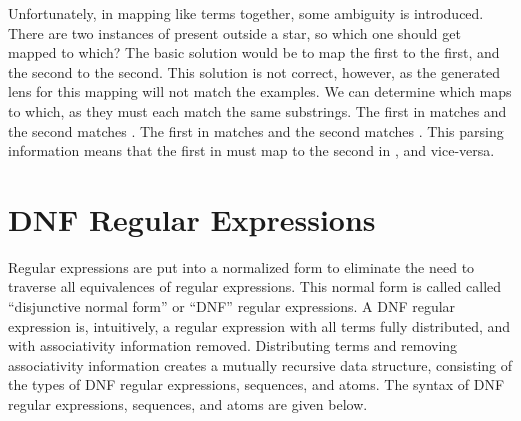\documentclass[numbers,10pt,preprint\ifanon ,nocopyrightspace\fi]{sigplanconf}
\begin{document}
Unfortunately, in mapping like terms together, some ambiguity is introduced.
There are two
instances of  present outside a star, so which one should get mapped to
which?  The basic solution would be to map the first to the first, and the
second to the second.  This solution is not correct, however, as the generated
lens for
this mapping will not match the examples.  We can determine which maps to which, as they
must each match the same substrings.  The first  in 
matches  and the second matches .  The first 
in  matches  and the second matches .
This parsing information means that the first  in  must map to the second
 in , and vice-versa.




\section{DNF Regular Expressions}

Regular expressions are put into a normalized form to eliminate the
need to traverse all equivalences of regular expressions.
This normal form is called called ``disjunctive normal form'' or
``DNF'' regular expressions.
A DNF regular expression is, intuitively, a regular expression with
all terms fully distributed, and with associativity information removed.
Distributing terms and removing associativity information creates a mutually
recursive data structure, consisting of the types of
DNF regular expressions, sequences, and atoms.
The syntax of DNF regular
expressions, sequences, and atoms are given below.\\
\end{document}
